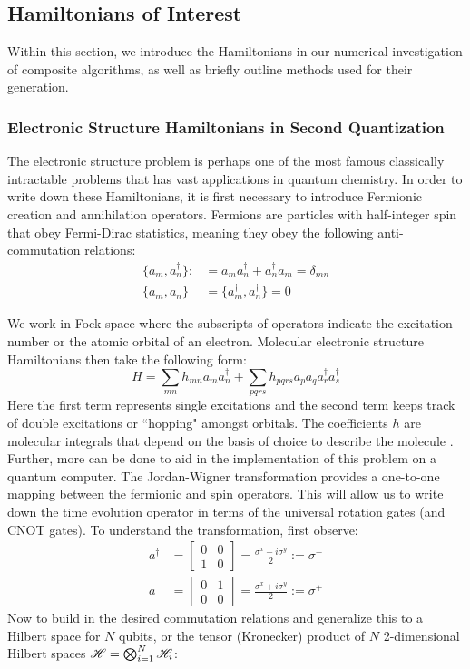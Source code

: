 \subsection{Hamiltonians of Interest}
Within this section, we introduce the Hamiltonians in our numerical investigation of composite algorithms, as well as briefly outline methods used for their generation. 

\subsubsection{Electronic Structure Hamiltonians in Second Quantization} \label{sec:hydrogen} The electronic structure problem is perhaps one of the most famous classically intractable problems that has vast applications in quantum chemistry. In order to write down these Hamiltonians, it is first necessary to introduce Fermionic creation and annihilation operators. Fermions are particles with half-integer spin that obey Fermi-Dirac statistics, meaning they obey the following anti-commutation relations:
\begin{align}
    \{a_m, a_n^\dagger\}:&= a_ma_n^\dagger + a_n^\dagger a_m = \delta_{mn} \\
    \{a_m, a_n\} &= \{a_m^\dagger, a_n^\dagger\} = 0
\end{align}

We work in Fock space where the subscripts of operators indicate the excitation number or the atomic orbital of an electron. Molecular electronic structure Hamiltonians then take the following form: 
\begin{equation}\label{eq:secondquant}
    H = \sum_{mn} h_{mn} a_m a_n^\dagger + \sum_{pqrs} h_{pqrs} a_p a_q a_r^\dagger a_s^\dagger 
\end{equation} 
Here the first term represents single excitations and the second term keeps track of double excitations or ``hopping" amongst orbitals. The coefficients $h$ are molecular integrals that depend on the basis of choice to describe the molecule \cite{whitfield2011simulation}. Further, more can be done to aid in the implementation of this problem on a quantum computer. The Jordan-Wigner transformation provides a one-to-one mapping between the fermionic and spin operators. This will allow us to write down the time evolution operator in terms of the universal rotation gates (and CNOT gates). To understand the transformation, first observe: 
\begin{align}
    a^\dagger &= \begin{bmatrix}
    0 & 0\\
    1 & 0 
    \end{bmatrix} = \frac{\sigma^x - i\sigma^y }{2}:= \sigma^- \\
    a &= \begin{bmatrix}
    0 & 1\\
    0 & 0 
    \end{bmatrix} = \frac{\sigma^x + i\sigma^y }{2}:= \sigma^+
\end{align}
Now to build in the desired commutation relations and  generalize this to a Hilbert space for $N$ qubits, or the tensor (Kronecker) product of $N$ 2-dimensional Hilbert spaces $\mathscr{H} = \bigotimes_{i=1}^N \mathscr{H}_i$:

